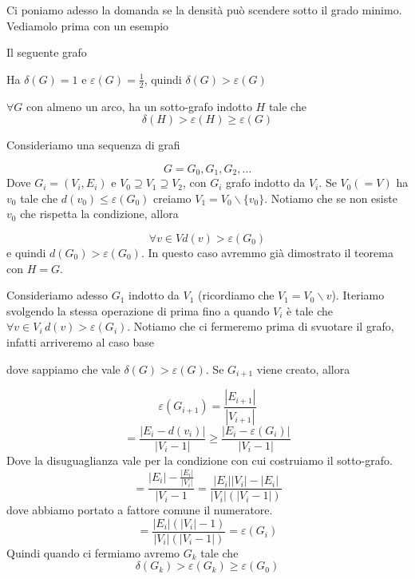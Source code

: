 \documentclass[12pt]{report}
\begin{document}
\noindent 
Ci poniamo adesso la domanda se la densità può scendere sotto il grado minimo. Vediamolo prima con un esempio

\begin{exmp}
    Il seguente grafo 

    \noindent 
    Ha $\delta(G) = 1$ e $\varepsilon(G) = \frac{1}{2}$, quindi $\delta(G) > \varepsilon(G)$
\end{exmp}

\begin{fatto}
    $\forall G$ con almeno un arco, ha un sotto-grafo indotto $H$ tale che 
    $$\delta(H) > \varepsilon(H) \geq \varepsilon(G) $$
\end{fatto}

\begin{dimo}
    Consideriamo una sequenza di grafi

    $$G = G_0, G_1, G_2, \dots$$
    Dove $G_i = (V_i,E_i)$ e $V_0 \supseteq V_1 \supseteq V_2$, con $G_i$ grafo indotto da $V_i$. Se $V_0(=V)$ ha $v_0$ tale che $d(v_0) \leq \varepsilon(G_0)$ creiamo $V_1 = V_0 \backslash \{v_0\}$. Notiamo che se non esiste $v_0$ che rispetta la condizione, allora 

    $$\forall v \in V d(v) > \varepsilon(G_0)$$
    e quindi $d(G_0) > \varepsilon(G_0)$. In questo caso avremmo già dimostrato il teorema con $H = G$.
    
    Consideriamo adesso $G_1$ indotto da $V_1$ (ricordiamo che $V_1 = V_0 \backslash v$). Iteriamo svolgendo la stessa operazione di prima fino a quando $V_i$ è tale che $\forall v \in V_i \, d(v) > \varepsilon(G_i)$. Notiamo che ci fermeremo prima di svuotare il grafo, infatti arriveremo al caso base 


    \noindent
    dove sappiamo che vale $\delta(G) > \varepsilon(G)$. Se $G_{i+1}$ viene creato, allora

    $$\varepsilon(G_{i+1}) = \frac{|E_{i+1}|}{|V_{i+1}|}$$
    $$=  \frac{|E_i - d(v_i)|}{|V_i - 1|} \geq  \frac{|E_i - \varepsilon(G_i)|}{|V_i - 1|} $$
    Dove la disuguaglianza vale per la condizione con cui costruiamo il sotto-grafo. 
    $$= \frac{|E_i| - \frac{|E_i|}{|V_i|}}{|V_i - 1} =  \frac{|E_i| |V_i| - |E_i|}{|V_i|(|V_i - 1|)}$$
    dove abbiamo portato a fattore comune il numeratore.
    $$= \frac{|E_i| (|V_i| - 1)}{|V_i|(|V_i - 1|)} = \varepsilon(G_i)$$
    Quindi quando ci fermiamo avremo $G_k$ tale che $$\delta(G_k) > \varepsilon (G_k) \geq \varepsilon(G_0) $$

    
\end{dimo}
\end{document}
